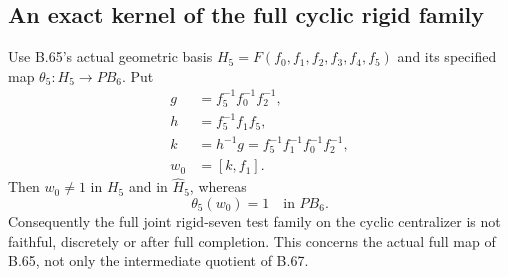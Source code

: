 \subsection*{An exact kernel of the full cyclic rigid family}

Use B.65's actual geometric basis
$H_5=F(f_0,f_1,f_2,f_3,f_4,f_5)$ and its specified map
$\theta_5:H_5\to PB_6$.
Put
\[
 \begin{split}
  g&=f_5^{-1}f_0^{-1}f_2^{-1},\\
  h&=f_5^{-1}f_1f_5,\\
  k&=h^{-1}g=f_5^{-1}f_1^{-1}f_0^{-1}f_2^{-1},\\
  w_0&=[k,f_1].
 \end{split}                                                    \tag{B.69.1}
\]
Then $w_0\ne1$ in $H_5$ and in $\widehat H_5$, whereas
\[
                    \theta_5(w_0)=1\quad\text{in }PB_6.
                                                               \tag{B.69.2}
\]
Consequently the full joint rigid-seven test family on
the cyclic centralizer is not faithful, discretely or
after full completion.  This concerns the actual full
map of B.65, not only the intermediate quotient of B.67.

